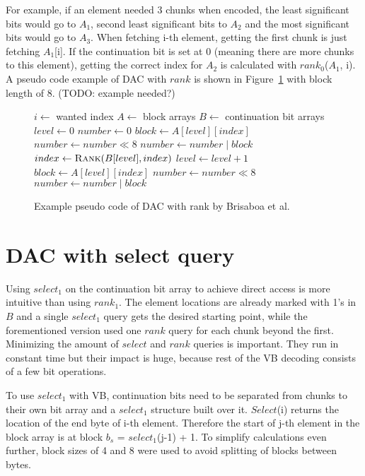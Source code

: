 For example, if an element needed 3 chunks when encoded, the least significant bits would go to $A_1$, second least significant bits to $A_2$ and the most significant 
bits would go to $A_3$. When fetching i-th element, getting the first chunk is just fetching $A_1$[i]. If the continuation bit is set at 0 (meaning there are more chunks 
to this element), getting the correct index for $A_2$ is calculated with $rank_0$($A_1$, i). A pseudo code example of DAC with $rank$ is shown in Figure~\ref{bris_pseudo} 
with block length of 8. (TODO: example needed?)


\begin{figure}[ht]
\begin{algorithmic}
\State $i \gets $ wanted index
\State $A \gets $ block arrays
\State $B \gets $ continuation bit arrays
\State $level \gets 0$
\State $number \gets 0$
\State $block \gets A[level][index]$
\State $number \gets number \mathbin{\ll} 8$
\State $number \gets number \mathbin{|} block$
\State $index \gets \Call{Rank}{B[level], index}$
\State $level \gets level + 1$
\EndWhile
\State $block \gets A[level][index]$
\State $number \gets number \mathbin{\ll} 8$
\State $number \gets number \mathbin{|} block$
\end{algorithmic}
\caption{Example pseudo code of DAC with rank by Brisaboa et al.} \label{bris_pseudo}
\end{figure}


\chapter{DAC with select query}

Using $select_1$ on the continuation bit array to achieve direct access is more intuitive than using $rank_1$. The element locations are already marked with 1's 
in $B$ and a single $select_1$ query gets the desired starting point, while the forementioned version \citep{Bri09} used one $rank$ query for each chunk beyond 
the first. Minimizing the amount of $select$ and $rank$ queries is important. They run in constant time but their impact is huge, because rest of the VB decoding 
consists of a few bit operations. 

To use $select_1$ with VB, continuation bits need to be separated from chunks to their own bit array and a $select_1$ structure built over it. $Select$(i) returns the
location of the end byte of i-th element. Therefore the start of j-th element in the block array is at block $b_s$ = $select_1$(j-1) + 1. To simplify calculations even further,
block sizes of 4 and 8 were used to avoid splitting of blocks between bytes.

